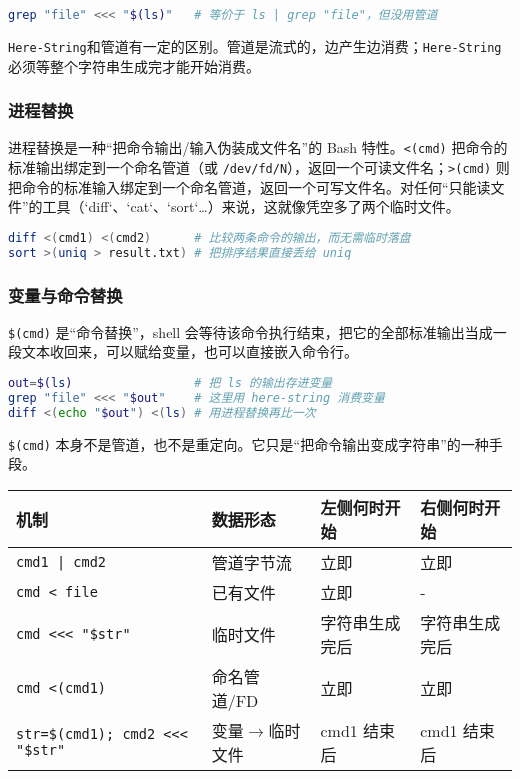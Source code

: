 \documentclass[../main.tex]{subfiles}
\begin{document}
\begin{lstlisting}[language=bash]
grep "file" <<< "$(ls)"   # 等价于 ls | grep "file"，但没用管道
\end{lstlisting}

\texttt{Here-String}和管道有一定的区别。管道是流式的，边产生边消费；\texttt{Here-String}必须等整个字符串生成完才能开始消费。

\subsubsection{进程替换}

进程替换是一种“把命令输出/输入伪装成文件名”的 Bash 特性。\texttt{<(cmd)} 把命令的标准输出绑定到一个命名管道（或 \texttt{/dev/fd/N}），返回一个可读文件名；\texttt{>(cmd)} 则把命令的标准输入绑定到一个命名管道，返回一个可写文件名。对任何“只能读文件”的工具（`diff`、`cat`、`sort`…）来说，这就像凭空多了两个临时文件。

\begin{lstlisting}[language=bash]
diff <(cmd1) <(cmd2)      # 比较两条命令的输出，而无需临时落盘
sort >(uniq > result.txt) # 把排序结果直接丢给 uniq
\end{lstlisting}

\subsubsection*{变量与命令替换}

\texttt{\$(cmd)} 是“命令替换”，shell 会等待该命令执行结束，把它的全部标准输出当成一段文本收回来，可以赋给变量，也可以直接嵌入命令行。

\begin{lstlisting}[language=bash]
out=$(ls)                 # 把 ls 的输出存进变量
grep "file" <<< "$out"    # 这里用 here-string 消费变量
diff <(echo "$out") <(ls) # 用进程替换再比一次
\end{lstlisting}

\texttt{\$(cmd)} 本身不是管道，也不是重定向。它只是“把命令输出变成字符串”的一种手段。

\begin{table}[ht]\small
  \centering
  \begin{tabular}{llll}
\toprule
机制 & 数据形态 & 左侧何时开始 & 右侧何时开始 \\
\midrule
\texttt{cmd1 | cmd2} & 管道字节流 & 立即 & 立即 \\
\texttt{cmd < file} & 已有文件 & 立即 & - \\
\texttt{cmd <<< "\$str"} & 临时文件 & 字符串生成完后 & 字符串生成完后 \\
\texttt{cmd <(cmd1)} & 命名管道/FD & 立即 & 立即 \\
\texttt{str=\$(cmd1); cmd2 <<< "\$str"} & 变量$\rightarrow$临时文件 & cmd1 结束后 & cmd1 结束后 \\
\bottomrule
\end{tabular}
\end{table}
\end{document}
